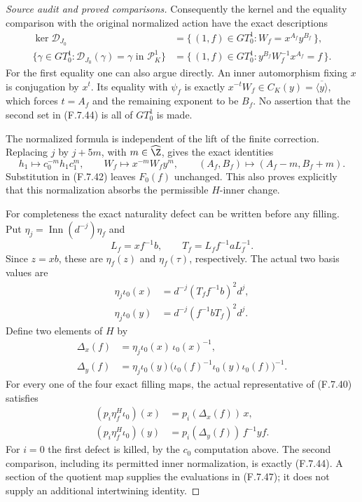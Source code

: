 \begin{proof}[Source audit and proved comparisons]
Consequently the kernel and the equality comparison
with the original normalized action have the exact
descriptions
\[
 \begin{split}
 \ker\mathcal D_{J_0}
   &=\{\,(1,f)\in GT_0^1:
                     W_f=x^{A_f}y^{B_f}\,\},\\
 \{\gamma\in GT_0^1:\mathcal D_{J_0}(\gamma)=\gamma
                                      \text{ in }\mathcal P_K^1\}
   &=\{\,(1,f)\in GT_0^1:
                     y^{B_f}W_f^{-1}x^{A_f}=f\,\}.
 \end{split}                                                   \tag{F.7.44}
\]
For the first equality one can also argue directly.
An inner automorphism fixing $x$ is conjugation
by $x^t$.  Its equality with $\psi_f$ is exactly
$x^{-t}W_f\in C_K(y)=\overline{\langle y\rangle}$,
which forces $t=A_f$ and the remaining exponent
to be $B_f$.
No assertion that the second set in (F.7.44)
is all of $GT_0^1$ is made.

The normalized formula is independent of the lift
of the finite correction.  Replacing $j$ by
$j+5m$, with $m\in\widehat\Z$, gives the exact
identities
\[
 h_1\longmapsto c_0^{-m}h_1c_1^m,\qquad
 W_f\longmapsto x^{-m}W_fy^m,\qquad
 (A_f,B_f)\longmapsto(A_f-m,B_f+m).
                                                               \tag{F.7.45}
\]
Substitution in (F.7.42) leaves $F_0(f)$ unchanged.
This also proves explicitly that this normalization
absorbs the permissible $H$-inner change.

For completeness the exact naturality defect can
be written before any filling.  Put
$\eta_j=\operatorname{Inn}(d^{-j})\eta_f$ and
\[
 L_f=x f^{-1}b,\qquad
 T_f=L_f f^{-1}a L_f^{-1}.
\]
Since $z=xb$, these are $\eta_f(z)$ and
$\eta_f(\tau)$, respectively.  The actual two
basis values are
\[
 \begin{split}
 \eta_j\iota_0(x)
     &=d^{-j}(T_f f^{-1}b)^2d^j,\\
 \eta_j\iota_0(y)
     &=d^{-j}(f^{-1}bT_f)^2d^j .
 \end{split}                                                   \tag{F.7.46}
\]
Define two elements of $H$ by
\[
 \begin{split}
 \Delta_x(f)&=\eta_j\iota_0(x)\,\iota_0(x)^{-1},\\
 \Delta_y(f)&=\eta_j\iota_0(y)
              \bigl(\iota_0(f)^{-1}
                       \iota_0(y)\iota_0(f)\bigr)^{-1}.
 \end{split}
\]
For every one of the four exact filling maps, the
actual representative of (F.7.40) satisfies
\[
 \begin{split}
 (p_i\eta_f^H\iota_0)(x)&=p_i(\Delta_x(f))\,x,\\
 (p_i\eta_f^H\iota_0)(y)&=
                   p_i(\Delta_y(f))\,f^{-1}yf .
 \end{split}                                                   \tag{F.7.47}
\]
For $i=0$ the first defect is killed, by the
$c_0$ computation above.  The second comparison,
including its permitted inner normalization, is
exactly (F.7.44).  A section of the quotient map
supplies the evaluations in (F.7.47); it does not
supply an additional intertwining identity.


\end{proof}
